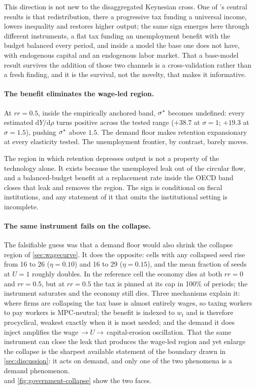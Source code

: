 This direction is not new to the disaggregated Keynesian cross. One of
\citeauthor{Teglio2025}'s central results is that redistribution, there a
progressive tax funding a universal income, lowers inequality and restores
higher output; the same sign emerges here through different instruments, a flat
tax funding an unemployment benefit with the budget balanced every period, and
inside a model the base one does not have, with endogenous capital and an
endogenous labor market. That a base-model result survives the addition of
those two channels is a cross-validation rather than a fresh finding, and it is
the survival, not the novelty, that makes it informative.

\paragraph{The benefit eliminates the wage-led region.} At $rr = 0.5$, inside
the empirically anchored band, $\sigma^{\ast}$ becomes undefined: every
estimated $\mathrm{d}Y/\mathrm{d}\rho$ turns positive across the tested range
($+38.7$ at $\sigma = 1$; $+19.3$ at $\sigma = 1.5$), pushing $\sigma^{\ast}$ above
$1.5$. The demand floor makes retention expansionary at every
elasticity tested. The unemployment frontier, by contrast, barely moves.

\begin{remark}
The region in which retention depresses output is not a property of the
technology alone. It exists because the unemployed leak out of the circular
flow, and a balanced-budget benefit at a replacement rate inside the OECD band
closes that leak and removes the region. The sign is conditional on
fiscal institutions, and any statement of it that omits the institutional
setting is incomplete.
\end{remark}

\paragraph{The same instrument fails on the collapse.} The falsifiable guess
was that a demand floor would also shrink the collapse region of
\cref{sec:wagecurve}. It does the opposite: cells with any collapsed seed rise
from 16 to 26 ($\eta = 0.10$) and 16 to 29 ($\eta = 0.15$), and the mean
fraction of seeds at $U = 1$ roughly doubles. In the reference cell the economy
dies at both $rr = 0$ and $rr = 0.5$, but at $rr = 0.5$ the tax is pinned
at its cap in 100\% of periods; the instrument saturates and the economy
still dies. Three mechanisms explain it: where firms are collapsing the tax
base is almost entirely wages, so taxing workers to pay workers is
MPC-neutral; the benefit is indexed to $w_t$ and is therefore
procyclical, weakest exactly when it is most needed; and the demand it
does inject amplifies the wage$\,\to U \to\,$capital-erosion
oscillation. That the same instrument can close the leak that produces the
wage-led region and yet enlarge the collapse is the sharpest available
statement of the boundary drawn in \cref{sec:discussion}: it acts on demand,
and only one of the two phenomena is a demand phenomenon. \\ 
and \cref{fig:government-collapse} show the two faces.


